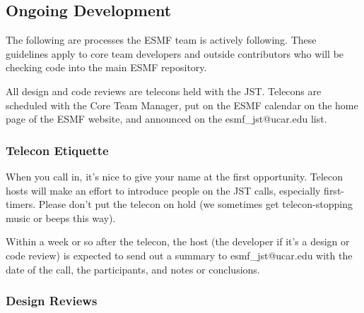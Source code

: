 \subsection{Ongoing Development}

The following are processes the ESMF team is actively following.  These
guidelines apply to core team developers and outside contributors
who will be checking code into the main ESMF repository.

All design and code reviews are telecons held with the JST. 
Telecons are scheduled with the Core Team Manager, put on the ESMF
calendar on the home page of the ESMF website, and announced on the
esmf\_jst@ucar.edu list.

\subsubsection{Telecon Etiquette}

When you call in, it's nice to give your name at the first opportunity.
Telecon hosts will make an effort to introduce people on the JST calls,
especially first-timers. Please don't put the telecon on hold (we sometimes
get telecon-stopping music or beeps this way).

Within a week or so after the telecon, the host (the developer if it's a design
or code review) is expected to send out a summary to esmf\_jst@ucar.edu
with the date of the call, the participants, and notes or conclusions.

\subsubsection{Design Reviews}

